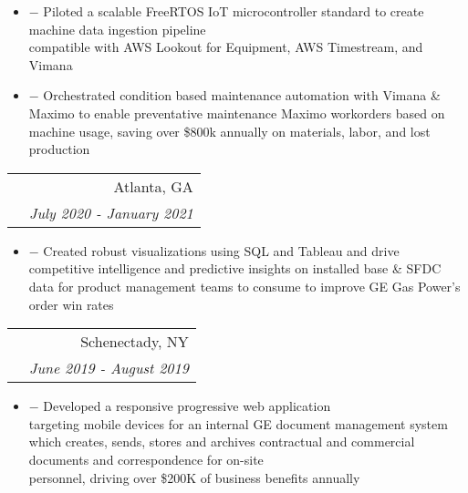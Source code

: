 \documentclass[10pt]{article}
\newcommand{\fancyunderline}[1]{%
    \uline{\phantom{#1}}%
    \llap{\contour{white}{#1}}%
}
\newenvironment{details}
{ \begin{itemize}
    \setlength{\itemsep}{0pt}
    \setlength{\parskip}{0pt}
    \setlength{\parsep}{0pt}     
}
{ \end{itemize}}
\newenvironment{indentDetails}
{ \begin{itemize}[leftmargin=*,labelindent=20pt]
    \setlength{\itemsep}{0pt}
    \setlength{\parskip}{0pt}
    \setlength{\parsep}{0pt}     
}
{ \end{itemize}}
\begin{document}
    \begin{indentDetails}
        \item[$-$] Piloted a scalable FreeRTOS IoT microcontroller standard to create machine data ingestion pipeline \\ compatible with AWS Lookout for Equipment, AWS Timestream, and Vimana
        \item[$-$] Orchestrated condition based maintenance automation with Vimana \& Maximo to enable preventative maintenance Maximo workorders based on machine usage, saving over \$800k annually on materials, labor, and lost production
    \end{indentDetails}
    \vspace{-6pt}
    \begin{tabular*}{1.015\textwidth}{l@{\extracolsep{\fill}}r}
        \hspace{-5pt} & Atlanta, GA \\
        \hspace{7.5pt} \fancyunderline{Data Analyst} & \textit{\small July 2020 - January 2021} \\
    \end{tabular*}\vspace{-2.5pt}
    \begin{indentDetails}
        \item[$-$] Created robust visualizations using SQL and Tableau and drive competitive intelligence and predictive insights on installed base \& SFDC data for product management teams to consume to improve GE Gas Power's order win rates
    \end{indentDetails}
    \vspace{-6pt}
    \begin{tabular*}{1.015\textwidth}{l@{\extracolsep{\fill}}r}
        \hspace{-5pt} & Schenectady, NY \\
        \hspace{-7.5pt} \fancyunderline{Digital Techonology Leadership Program Intern: Lead Mobile Developer} & \textit{\small June 2019 - August 2019} \\
    \end{tabular*}\vspace{-2.5pt}
    \begin{details}
        \item[$-$] Developed a responsive progressive web application \\ targeting mobile devices for an internal GE document management system which creates, sends, stores and archives contractual and commercial documents and correspondence for on-site \\ personnel, driving over \$200K of business benefits annually 
    \end{details}
\end{document}
